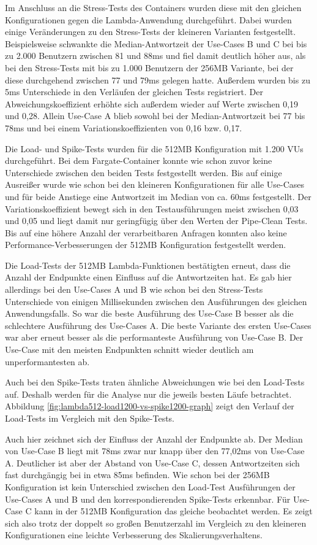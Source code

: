 Im Anschluss an die Stress-Tests des Containers wurden diese mit den gleichen Konfigurationen gegen die Lambda-Anwendung durchgeführt. Dabei wurden einige Veränderungen zu den Stress-Tests der kleineren Varianten festgestellt. Beispielsweise schwankte die Median-Antwortzeit der Use-Cases B und C bei bis zu 2.000 Benutzern zwischen 81 und 88ms und fiel damit deutlich höher aus, als bei den Stress-Tests mit bis zu 1.000 Benutzern der 256MB Variante, bei der diese durchgehend zwischen 77 und 79ms gelegen hatte. Außerdem wurden bis zu 5ms Unterschiede in den Verläufen der gleichen Tests registriert. Der Abweichungskoeffizient erhöhte sich außerdem wieder auf Werte zwischen 0,19 und 0,28. Allein Use-Case A blieb sowohl bei der Median-Antwortzeit bei 77 bis 78ms und bei einem Variationskoeffizienten von 0,16 bzw. 0,17.

Die Load- und Spike-Tests wurden für die 512MB Konfiguration mit 1.200 \acp{VU} durchgeführt. Bei dem Fargate-Container konnte wie schon zuvor keine Unterschiede zwischen den beiden Tests festgestellt werden. Bis auf einige Ausreißer wurde wie schon bei den kleineren Konfigurationen für alle Use-Cases und für beide Anstiege eine Antwortzeit im Median von ca. 60ms festgestellt. Der Variationskoeffizient bewegt sich in den Testausführungen meist zwischen 0,03 und 0,05 und liegt damit nur geringfügig über den Werten der Pipe-Clean Tests. Bis auf eine höhere Anzahl der verarbeitbaren Anfragen konnten also keine Performance-Verbesserungen der 512MB Konfiguration festgestellt werden.

Die Load-Tests der 512MB Lambda-Funktionen bestätigten erneut, dass die Anzahl der Endpunkte einen Einfluss auf die Antwortzeiten hat. Es gab hier allerdings bei den Use-Cases A und B wie schon bei den Stress-Tests Unterschiede von einigen Millisekunden zwischen den Ausführungen des gleichen Anwendungsfalls. So war die beste Ausführung des Use-Case B besser als die schlechtere Ausführung des Use-Cases A. Die beste Variante des ersten Use-Cases war aber erneut besser als die performanteste Ausführung von Use-Case B. Der Use-Case mit den meisten Endpunkten schnitt wieder deutlich am unperformantesten ab.

Auch bei den Spike-Tests traten ähnliche Abweichungen wie bei den Load-Tests auf. Deshalb werden für die Analyse nur die jeweils besten Läufe betrachtet. Abbildung \ref{fig:lambda512-load1200-vs-spike1200-graph} zeigt den Verlauf der Load-Tests im Vergleich mit den Spike-Tests. 

Auch hier zeichnet sich der Einfluss der Anzahl der Endpunkte ab. Der Median von Use-Case B liegt mit 78ms zwar nur knapp über den 77,02ms von Use-Case A. Deutlicher ist aber der Abstand von Use-Case C, dessen Antwortzeiten sich fast durchgängig bei in etwa 85ms befinden. 
Wie schon bei der 256MB Konfiguration ist kein Unterschied zwischen den Load-Test Ausführungen der Use-Cases A und B und den korrespondierenden Spike-Tests erkennbar. Für Use-Case C kann in der 512MB Konfiguration das gleiche beobachtet werden. Es zeigt sich also trotz der doppelt so großen Benutzerzahl im Vergleich zu den kleineren Konfigurationen eine leichte Verbesserung des Skalierungsverhaltens.

